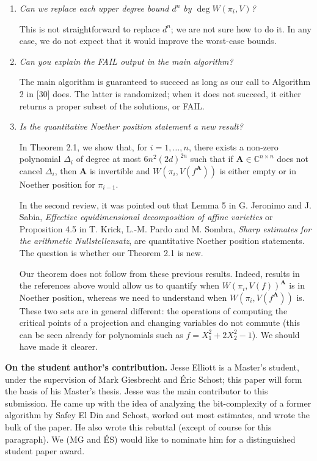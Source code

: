 \documentclass{article}
\def\mA{{\bm A}}
\def\C{\mathbb{C}}
\def\D{\Delta}
\begin{document}
\begin{enumerate}
    \item \textit{Can we replace each upper degree bound $d^n$ by
      $\deg W(\pi_i,V)$? }
    
    This is not straightforward to replace $d^n$; we are not sure how
    to do it. In any case, we do not expect that it would improve the
    worst-case bounds.
    
    \item \textit{Can you explain the FAIL output in the main algorithm?}
    
    The main algorithm is guaranteed to succeed as long as our call
    to Algorithm 2 in [30] does. The latter is randomized; when it
    does not succeed, it either returns a proper subset of the
    solutions, or FAIL.
        
    \item\textit{Is the quantitative Noether position statement a new result? }
    
    In Theorem 2.1, we show that, for $i=1,\dots,n$, there exists a
    non-zero polynomial $\D_i$ of degree at most
    $6n^2(2d)^{2n}$ such that if $\mA \in \C^{n\times n}$ does not
    cancel $\D_i$, then $\mA$ is invertible and $W(\pi_i,V(f^{\mA}))$
    is either empty or in Noether position for $\pi_{i-1}$.

    In the second review, it was pointed out that Lemma 5 in G. Jeronimo
    and J. Sabia, {\em Effective equidimensional decomposition of affine
      varieties} or Proposition 4.5 in T. Krick, L.-M. Pardo and
    M. Sombra, {\em Sharp estimates for the arithmetic Nullstellensatz},
    are quantitative Noether position statements. The question is  
    whether our Theorem 2.1 is new. 
    
    Our theorem does not follow from these previous results. Indeed,
    results in the references above would allow us to quantify when
    $W(\pi_i,V(f))^\mA$ is in Noether position, whereas we need to
    understand when $W(\pi_i,V(f^\mA))$ is. These two sets are in general
    different: the operations of computing the critical points of a
    projection and changing variables do not commute (this can be seen
    already for polynomials such as $f = X_1^2 + 2X_2^2-1$).
    We should have made it clearer.
\end{enumerate}

\vspace{2mm}
\par 
\noindent \textbf{On the student author's contribution.}  Jesse
Elliott is a Master's student, under the supervision of Mark
Giesbrecht and \'Eric Schost; this paper will form the basis of his
Master's thesis. Jesse was the main contributor to this submission. He
came up with the idea of analyzing the bit-complexity of a former
algorithm by Safey El Din and Schost, worked out most estimates, and
wrote the bulk of the paper. He also wrote this rebuttal (except of
course for this paragraph). We (MG and \'ES) would like to nominate
him for a distinguished student paper award.










\end{document}
